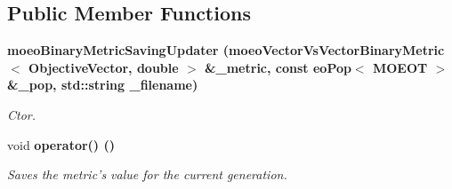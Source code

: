 \subsection*{Public Member Functions}
\begin{CompactItemize}
\item 
\bf{moeo\-Binary\-Metric\-Saving\-Updater} (\bf{moeo\-Vector\-Vs\-Vector\-Binary\-Metric}$<$ \bf{Objective\-Vector}, double $>$ \&\_\-metric, const \bf{eo\-Pop}$<$ MOEOT $>$ \&\_\-pop, std::string \_\-filename)
\begin{CompactList}\small\item\em Ctor. \item\end{CompactList}\item 
void \bf{operator()} ()\label{classmoeoBinaryMetricSavingUpdater_a4f0a9e86b4a39ef88e7f8e1c1d6d229}

\begin{CompactList}\small\item\em Saves the metric's value for the current generation. \item\end{CompactList}\end{CompactItemize}
